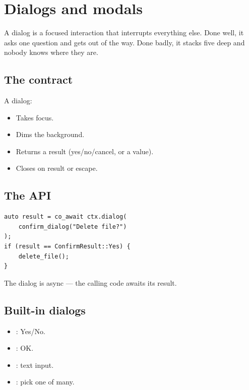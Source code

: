 \chapter{Dialogs and modals}
\label{ch:dialogs}

\begin{aside}
A dialog is a focused interaction that interrupts everything
else. Done well, it asks one question and gets out of the
way. Done badly, it stacks five deep and nobody knows where
they are.
\end{aside}

\section{The contract}

A dialog:

\begin{itemize}[leftmargin=*]
  \item Takes focus.
  \item Dims the background.
  \item Returns a result (yes/no/cancel, or a value).
  \item Closes on result or escape.
\end{itemize}

\section{The API}

\begin{lstlisting}
auto result = co_await ctx.dialog(
    confirm_dialog("Delete file?")
);
if (result == ConfirmResult::Yes) {
    delete_file();
}
\end{lstlisting}

The dialog is async --- the calling code awaits its result.

\section{Built-in dialogs}

\begin{itemize}[leftmargin=*]
  \item {}: Yes/No.
  \item {}: OK.
  \item {}: text input.
  \item {}: pick one of many.
\end{itemize}

